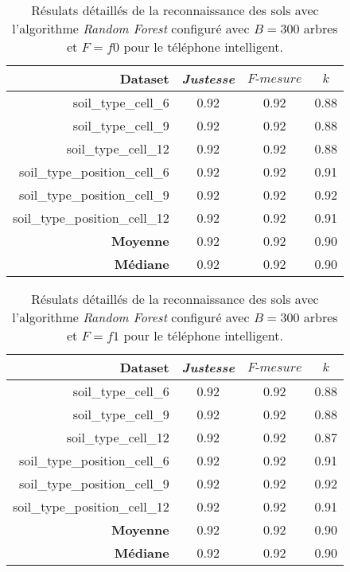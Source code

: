 \begin{table}[H]\renewcommand{\arraystretch}{0.5}
	\centering
	\caption{Résulats détaillés de la reconnaissance des sols avec l'algorithme \textit{Random Forest} configuré avec $B=300$ arbres et $F=f0$ pour le téléphone intelligent.}
	\label{tab:rf-300-f0-cell}
	\begin{tabular}{@{}rccc@{}}
		\toprule
			\textbf{Dataset} & \textit{Justesse} & $F\mbox{-} mesure$ & \textbf{$k$} \\
		\midrule
			soil\_type\_cell\_6 & 0.92 & 0.92 & 0.88 \\
			soil\_type\_cell\_9 & 0.92 & 0.92 & 0.88 \\
			soil\_type\_cell\_12 & 0.92 & 0.92 & 0.88 \\
			soil\_type\_position\_cell\_6 & 0.92 & 0.92 & 0.91 \\
			soil\_type\_position\_cell\_9 & 0.92 & 0.92 & 0.92 \\
			soil\_type\_position\_cell\_12 & 0.92 & 0.92 & 0.91 \\
			\textbf{Moyenne} & 0.92 & 0.92 & 0.90 \\
			\textbf{Médiane} & 0.92 & 0.92 & 0.90 \\
		\bottomrule
	\end{tabular}
\end{table}

\begin{table}[H]\renewcommand{\arraystretch}{0.5}
	\centering
	\caption{Résulats détaillés de la reconnaissance des sols avec l'algorithme \textit{Random Forest} configuré avec $B=300$ arbres et $F=f1$ pour le téléphone intelligent.}
	\label{tab:rf-300-f1-cell}
	\begin{tabular}{@{}rccc@{}}
		\toprule
			\textbf{Dataset} & \textit{Justesse} & $F\mbox{-} mesure$ & \textbf{$k$} \\
		\midrule
			soil\_type\_cell\_6 & 0.92 & 0.92 & 0.88 \\
			soil\_type\_cell\_9 & 0.92 & 0.92 & 0.88 \\
			soil\_type\_cell\_12 & 0.92 & 0.92 & 0.87 \\
			soil\_type\_position\_cell\_6 & 0.92 & 0.92 & 0.91 \\
			soil\_type\_position\_cell\_9 & 0.92 & 0.92 & 0.92 \\
			soil\_type\_position\_cell\_12 & 0.92 & 0.92 & 0.91 \\
			\textbf{Moyenne} & 0.92 & 0.92 & 0.90 \\
			\textbf{Médiane} & 0.92 & 0.92 & 0.90 \\
		\bottomrule
	\end{tabular}
\end{table}

